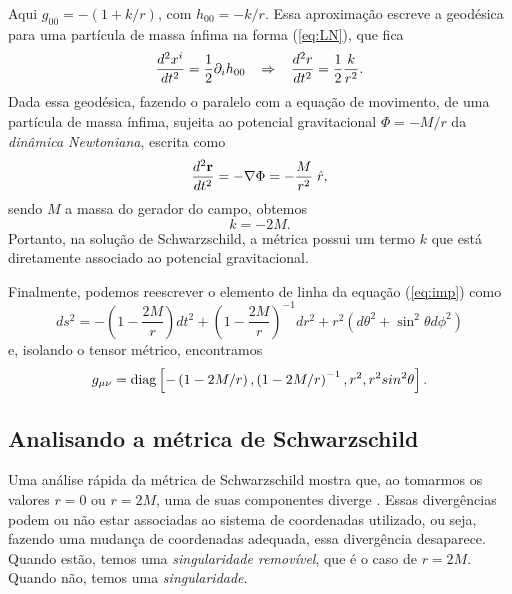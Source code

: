 \documentclass[12pt,a4paper,titlepage,brazil]{article}
\begin{document}
Aqui $g_{0 0} = - \left(1 + k/r\right)$, com $h_{0 0} = - k/r$. Essa aproximação escreve a geodésica para uma partícula de massa ínfima na forma (\ref{eq:LN}), que fica
\begin{equation}
  \frac{d^2 x^i}{d t^2} =  \frac{1}{2} \partial_i h_{0 0} \hspace{0.3cm} \Rightarrow \hspace{0.3cm}
  \frac{d^2 r}{d t^2} = \frac{1}{2} \frac{k}{r^2} .
\end{equation}
Dada essa geodésica, fazendo o paralelo com a equação de movimento, de uma partícula de massa ínfima, sujeita ao potencial gravitacional $\Phi = - M/r$ da \textit{dinâmica Newtoniana}, escrita como
\begin{equation}
 \frac{d^2 \textbf{r}}{d t^2} = - \nabla \Phi = - \frac{M}{r^2} \hspace{0.1cm} \hat{r} ,
\end{equation}
sendo $M$ a massa do gerador do campo, obtemos
\begin{equation}
 k = - 2 M .
\end{equation}
Portanto, na solução de Schwarzschild, a métrica possui um termo $k$ que está diretamente associado ao potencial gravitacional.

Finalmente, podemos reescrever o elemento de linha da equação (\ref{eq:imp}) como
\begin{equation}
 \label{eq:linhasch}
 ds^2 = - \left(1 - \frac{2 M}{r}\right) dt^2 + \left(1 - \frac{2 M}{r}\right)^{- 1} dr^2
 + r^2 \left( d \theta^2 + \sin^2 \theta d \phi^2 \right) 
\end{equation}
e, isolando o tensor métrico, encontramos 
\begin{equation}
 \label{eq:gschwarzschild}
 g_{\mu \nu} = \textnormal{diag} \left[ - \left(1 - 2M/r\right), \left(1 - 2M/r\right)^{-1}, 
r^2, r^2 sin^2 \theta \right].
\end{equation}


\subsection{Analisando a métrica de Schwarzschild}
\label{subsec:metricaschwarzschild}

Uma análise rápida da métrica de Schwarzschild mostra que, ao tomarmos os valores $r = 0$ ou $r = 2M$, uma de suas componentes diverge \cite{carroll2004}. Essas divergências podem ou não estar associadas ao sistema de coordenadas utilizado, ou seja, fazendo  uma mudança de coordenadas adequada, essa divergência desaparece. Quando estão, temos uma \emph{singularidade removível}, que é o caso de $r = 2 M$. Quando não, temos uma \emph{singularidade}. 
\end{document}
